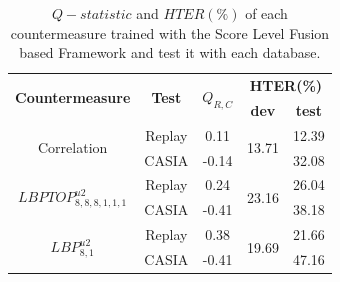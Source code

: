 \begin{table}[ht]
\caption{$Q-statistic$ and $HTER(\%)$ of each countermeasure trained with the Score Level Fusion based Framework and test it with each database.}
\begin{center}
  \begin{tabular}{ | c | c | c | c  c |}
    \hline

   \multirow{2}{*}{\textbf{Countermeasure}} &  \multirow{2}{*}{\textbf{Test}} & \multirow{2}{*}{\textbf{$Q_{R,C}$}} & \multicolumn{2}{c|}{\textbf{HTER(\%)}}  \\ 
     &  &  & \textbf{dev} & \textbf{test}  \\ \hline
    
    \multirow{2}{*}{Correlation} & Replay & 0.11 &  \multirow{2}{*}{13.71} & 12.39\\
               & CASIA & -0.14 &  & 32.08 \\ \hline \hline

    \multirow{2}{*}{$LBPTOP_{8,8,8,1,1,1}^{u2}$}  & Replay  & 0.24 &\multirow{2}{*}{23.16} & 26.04 \\
               &  CASIA  & -0.41 & & 38.18 \\ \hline \hline

    \multirow{2}{*}{$LBP_{8,1}^{u2}$}  & Replay  & 0.38 & \multirow{2}{*}{19.69} & 21.66  \\
                & CASIA & -0.41 &  & 47.16 \\
    \hline
  \end{tabular}
\end{center}
\label{tb:FrameworkTest}
\end{table}



